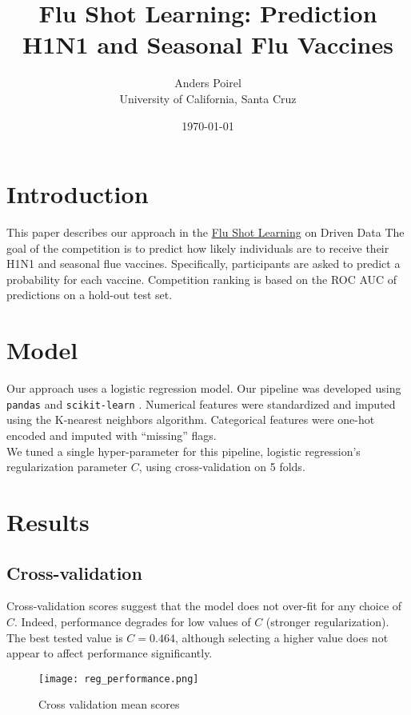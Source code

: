 \documentclass{article}[12pt]
\title{Flu Shot Learning: Prediction H1N1 and Seasonal Flu Vaccines}
\author{Anders Poirel \\ University of California, Santa Cruz}
\date{\today}
\begin{document}
    
\maketitle

\section{Introduction}

This paper describes our approach in 
the \href{https://www.drivendata.org/competitions/66/flu-shot-learning/}{Flu Shot Learning}
on Driven Data \cite{driven-data}
The goal of the competition is to predict how likely individuals are to receive their 
H1N1 and seasonal flue vaccines. Specifically, participants are asked to predict a 
probability for each vaccine. Competition ranking is based on the ROC AUC of predictions 
on a hold-out test set.

\section{Model}

Our approach uses a logistic regression model. Our pipeline was developed using
\verb|pandas| \cite{scikit-learn} and \verb|scikit-learn| \cite{scikit-learn}. 
Numerical features were standardized and imputed using the K-nearest neighbors
algorithm. Categorical features were one-hot encoded and imputed with ``missing''
flags. \\
We tuned a single hyper-parameter for this pipeline, logistic regression's regularization
parameter $C$, using cross-validation on 5 folds. 

\section{Results}

\subsection{Cross-validation}

Cross-validation scores suggest that the model does not over-fit for any choice
of $C$. Indeed, performance degrades for low values of $C$ (stronger regularization).
The best tested value is $C = 0.464$, although selecting a higher value does not 
appear to affect performance significantly.

\begin{figure}
\caption{Cross validation mean scores}
\texttt{[image: reg\_performance.png]}
\end{figure}
\end{document}
